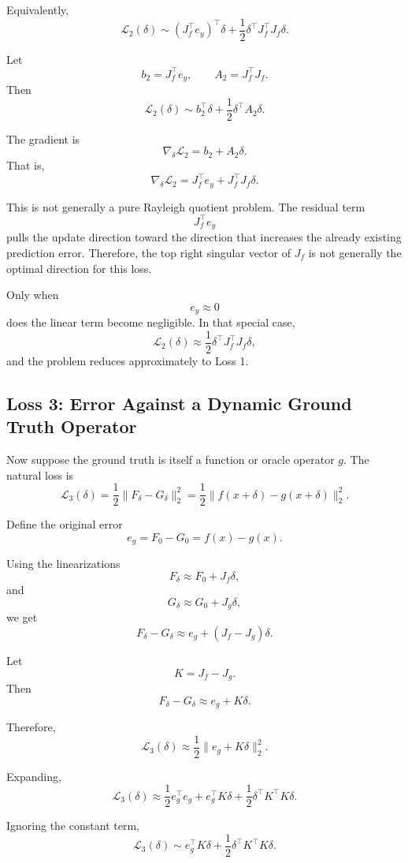 \documentclass{article}
\begin{document}
Equivalently,
\[
    \mathcal{L}_2(\delta)
    \sim
    (J_f^\top e_y)^\top \delta
    +
    \frac{1}{2}\delta^\top J_f^\top J_f\delta.
\]

Let
\[
    b_2 = J_f^\top e_y,
    \qquad
    A_2 = J_f^\top J_f.
\]
Then
\[
    \mathcal{L}_2(\delta)
    \sim
    b_2^\top \delta
    +
    \frac{1}{2}\delta^\top A_2\delta.
\]

The gradient is
\[
    \nabla_\delta \mathcal{L}_2
    =
    b_2 + A_2\delta.
\]
That is,
\[
    \nabla_\delta \mathcal{L}_2
    =
    J_f^\top e_y
    +
    J_f^\top J_f\delta.
\]

This is not generally a pure Rayleigh quotient problem. The residual term
\[
    J_f^\top e_y
\]
pulls the update direction toward the direction that increases the already existing prediction error. Therefore, the top right singular vector of \(J_f\) is not generally the optimal direction for this loss.

Only when
\[
    e_y \approx 0
\]
does the linear term become negligible. In that special case,
\[
    \mathcal{L}_2(\delta)
    \approx
    \frac{1}{2}\delta^\top J_f^\top J_f\delta,
\]
and the problem reduces approximately to Loss 1.

\subsection{Loss 3: Error Against a Dynamic Ground Truth Operator}

Now suppose the ground truth is itself a function or oracle operator \(g\). The natural loss is
\[
    \mathcal{L}_3(\delta)
    =
    \frac{1}{2}\|F_\delta-G_\delta\|_2^2
    =
    \frac{1}{2}\|f(x+\delta)-g(x+\delta)\|_2^2.
\]

Define the original error
\[
    e_g=F_0-G_0=f(x)-g(x).
\]

Using the linearizations
\[
    F_\delta\approx F_0+J_f\delta,
\]
and
\[
    G_\delta\approx G_0+J_g\delta,
\]
we get
\[
    F_\delta-G_\delta
    \approx
    e_g+(J_f-J_g)\delta.
\]

Let
\[
    K=J_f-J_g.
\]
Then
\[
    F_\delta-G_\delta
    \approx
    e_g+K\delta.
\]

Therefore,
\[
    \mathcal{L}_3(\delta)
    \approx
    \frac{1}{2}\|e_g+K\delta\|_2^2.
\]

Expanding,
\[
    \mathcal{L}_3(\delta)
    \approx
    \frac{1}{2}e_g^\top e_g
    +
    e_g^\top K\delta
    +
    \frac{1}{2}\delta^\top K^\top K\delta.
\]

Ignoring the constant term,
\[
    \mathcal{L}_3(\delta)
    \sim
    e_g^\top K\delta
    +
    \frac{1}{2}\delta^\top K^\top K\delta.
\]
\end{document}
